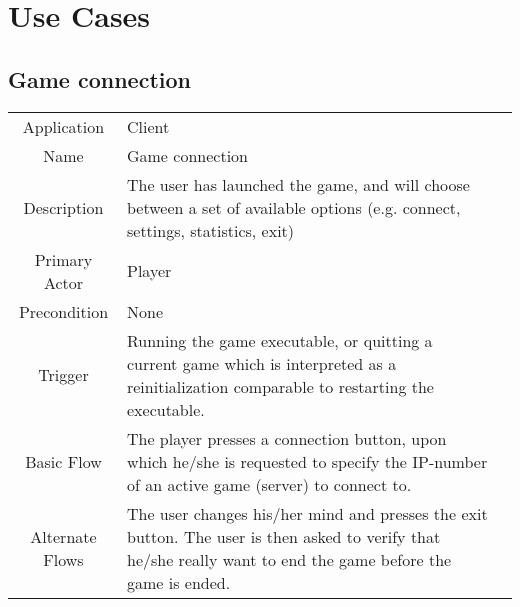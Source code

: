 \section{Use Cases}
\label{sec:usecases}


\subsection{Game connection}
\label{connection}
\begin{tabular}{|c| p{9cm}|c}
\hline
Application	& Client  \\
Name & Game connection  \\
Description	& The user has launched the game, and will choose between a set of available options (e.g. connect, settings, statistics, exit)  \\
Primary Actor & Player \\
Precondition &None \\
Trigger & Running the game executable, or quitting a current game which is interpreted as a reinitialization comparable to restarting the executable.  \\ \hline
Basic Flow & The player presses a connection button, upon which he/she is  requested to specify the IP-number of an active game (server) to connect to.  \\ \hline
Alternate Flows & The user changes his/her mind and presses the exit button. The user is then asked to verify that he/she really want to end the game before the game is ended.  \\
\hline
\end{tabular}


